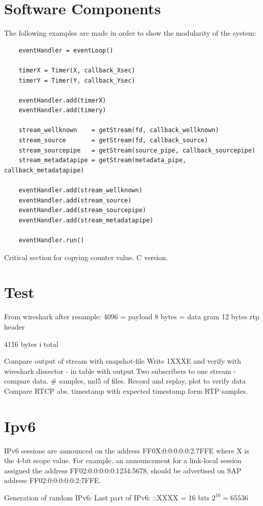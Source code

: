 \section{Software Components}
The following examples are made in order to show the modularity of the system:



\begin{listing}[h] 
\begin{verbatim}
	eventHandler = eventLoop()
	
	timerX = Timer(X, callback_Xsec)
	timerY = Timer(Y, callback_Ysec)
	
	eventHandler.add(timerX)
	eventHandler.add(timery)
	
	stream_wellknown    = getStream(fd, callback_wellknown)
	stream_source       = getStream(fd, callback_source)
	stream_sourcepipe   = getStream(source_pipe, callback_sourcepipe)
	stream_metadatapipe = getStream(metadata_pipe, callback_metadatapipe)	
	
	eventHandler.add(stream_wellknown)
	eventHandler.add(stream_source)
	eventHandler.add(stream_sourcepipe)
	eventHandler.add(stream_metadatapipe)
	
	eventHandler.run()
\end{verbatim}
\caption{Critical section for copying counter value. C version.}
\label{code:critical_section_c}
\end{listing}



\section{Test}
From wireshark after resample:
4096 = payload
8 bytes = data gram
12 bytes rtp header

4116 bytes i total

Compare output of stream with snapshot-file
Write 1XXXE and verify with wireshark dissector
    - in table with output
Two subscribers to one stream - compare data. \# samples, md5 of files.
Record and replay, plot to verify data
Compare RTCP abs. timestamp with expected timestamp form RTP samples.



\section{Ipv6}
   IPv6 sessions are announced on the address FF0X:0:0:0:0:0:2:7FFE
      where X is the 4-bit scope value.  For example, an announcement
      for a link-local session assigned the address
      FF02:0:0:0:0:0:1234:5678, should be advertised on SAP address
      FF02:0:0:0:0:0:2:7FFE.
      

Generation of random IPv6:
Last part of IPv6:
::XXXX = 16 bits
$2^16 = 65536$



